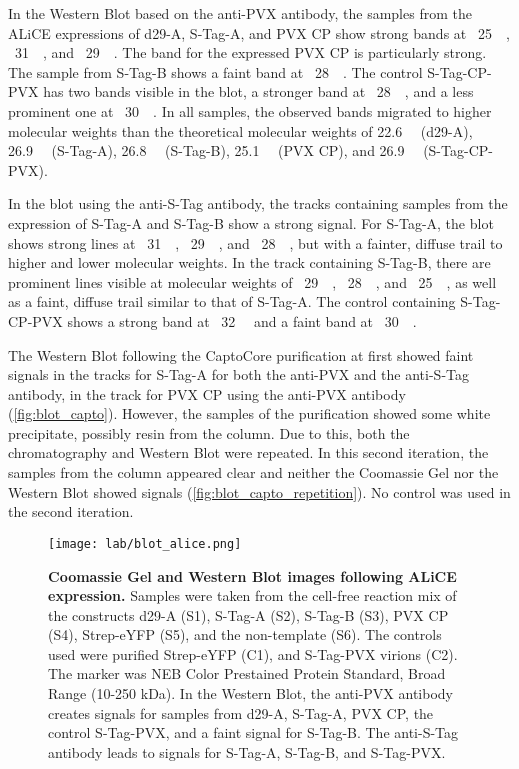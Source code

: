 In the Western Blot based on the anti-PVX antibody, the samples from the ALiCE expressions of d29-A, S-Tag-A, and PVX CP show strong bands at ~\SI{25}{\kilo\Dalton}, ~\SI{31}{\kilo\Dalton}, and ~\SI{29}{\kilo\Dalton}. The band for the expressed PVX CP is particularly strong. The sample from S-Tag-B shows a faint band at ~\SI{28}{\kilo\Dalton}. The control S-Tag-CP-PVX has two bands visible in the blot, a stronger band at ~\SI{28}{\kilo\Dalton}, and a less prominent one at ~\SI{30}{\kilo\Dalton}. In all samples, the observed bands migrated to higher molecular weights than the theoretical molecular weights of \SI{22.6}{\kilo\Dalton} (d29-A), \SI{26.9}{\kilo\Dalton} (S-Tag-A), \SI{26.8}{\kilo\Dalton} (S-Tag-B), \SI{25.1}{\kilo\Dalton} (PVX CP), and \SI{26.9}{\kilo\Dalton} (S-Tag-CP-PVX).

In the blot using the anti-S-Tag antibody, the tracks containing samples from the expression of S-Tag-A and S-Tag-B show a strong signal. For S-Tag-A, the blot shows strong lines at ~\SI{31}{\kilo\Dalton}, ~\SI{29}{\kilo\Dalton}, and ~\SI{28}{\kilo\Dalton}, but with a fainter, diffuse trail to higher and lower molecular weights. In the track containing S-Tag-B, there are prominent lines visible at molecular weights of ~\SI{29}{\kilo\Dalton}, ~\SI{28}{\kilo\Dalton}, and ~\SI{25}{\kilo\Dalton}, as well as a faint, diffuse trail similar to that of S-Tag-A. The control containing S-Tag-CP-PVX shows a strong band at ~\SI{32}{\kilo\Dalton} and a faint band at ~\SI{30}{\kilo\Dalton}.

The Western Blot following the CaptoCore purification at first showed faint signals in the tracks for S-Tag-A for both the anti-PVX and the anti-S-Tag antibody, in the track for PVX CP using the anti-PVX antibody (\autoref{fig:blot_capto}). However, the samples of the purification showed some white precipitate, possibly resin from the column. Due to this, both the chromatography and Western Blot were repeated. In this second iteration, the samples from the column appeared clear and neither the Coomassie Gel nor the Western Blot showed signals (\autoref{fig:blot_capto_repetition}). No control was used in the second iteration.


\begin{figure}
\texttt{[image: lab/blot\_alice.png]}
\caption{\textbf{Coomassie Gel and Western Blot images following ALiCE expression.} Samples were taken from the cell-free reaction mix of the constructs d29-A (S1), S-Tag-A (S2), S-Tag-B (S3), PVX CP (S4), Strep-eYFP (S5), and the non-template (S6). The controls used were purified Strep-eYFP (C1), and S-Tag-PVX virions (C2). The marker was NEB Color Prestained Protein Standard, Broad Range (10-250 kDa). In the Western Blot, the anti-PVX antibody creates signals for samples from d29-A, S-Tag-A, PVX CP, the control S-Tag-PVX, and a faint signal for S-Tag-B. The anti-S-Tag antibody leads to signals for S-Tag-A, S-Tag-B, and S-Tag-PVX. }
\label{fig:blot_alice}
\end{figure}

